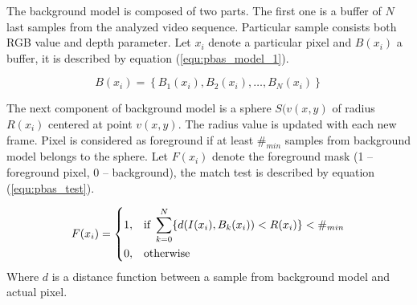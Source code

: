 \documentclass[b5paper,10pt,twoside]{article}
\begin{document}
{The background model is composed of two parts. The first one is a buffer of $N$ last samples from the analyzed video sequence. Particular sample consists both RGB value and depth parameter. Let $x_i$ denote a particular pixel and $B(x_i)$ a buffer, it is described by equation (\ref{equ:pbas_model_1}).


	\begin{equation}
		B(x_i)= \left\{ B_1(x_i), B_2(x_i), \dotsc, B_N(x_i) \right\}
	\label{equ:pbas_model_1}	
	\end{equation}

The next component of background model is a sphere $S(v(x,y)$ of radius $R(x_i)$ centered at point $v(x,y)$. The radius value is updated with each new frame. Pixel is considered as foreground if at least $\#_{min}$ samples from background model belongs to the sphere. Let $F(x_i)$ denote the foreground mask (1 -- foreground pixel, 0 -- background), the match test is described by equation (\ref{equ:pbas_test}).


	\begin{equation}
	    F(x_i) = 
		\begin{dcases}
    		1, & \text{if } \sum_{k=0}^{N} \{ d(I(x_i), B_k(x_i)) < R(x_i) \} < \#_{min} \\
    		0, & \text{otherwise} 
		\end{dcases}
	\label{equ:pbas_test}	
	\end{equation}
\noindent Where $d$ is a distance function between a sample from background model and actual pixel.	
	

}
\end{document}
